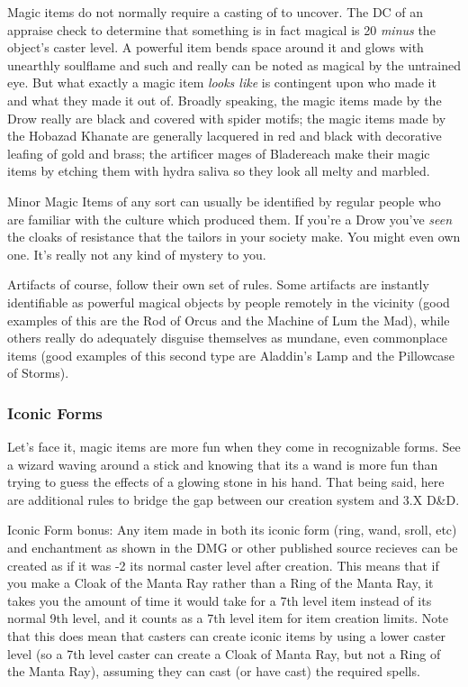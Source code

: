 Magic items do not normally require a casting of  to uncover. The DC of an appraise check to determine that something is in fact magical is 20 \textit{minus} the object's caster level. A powerful item bends space around it and glows with unearthly soulflame and such and really can be noted as magical by the untrained eye. But what exactly a magic item \textit{looks like} is contingent upon who made it and what they made it out of. Broadly speaking, the magic items made by the Drow really are black and covered with spider motifs; the magic items made by the Hobazad Khanate are generally lacquered in red and black with decorative leafing of gold and brass; the artificer mages of Bladereach make their magic items by etching them with hydra saliva so they look all melty and marbled.

Minor Magic Items of any sort can usually be identified by regular people who are familiar with the culture which produced them. If you're a Drow you've \textit{seen} the cloaks of resistance that the tailors in your society make. You might even own one. It's really not any kind of mystery to you.

Artifacts of course, follow their own set of rules. Some artifacts are instantly identifiable as powerful magical objects by people remotely in the vicinity (good examples of this are the Rod of Orcus and the Machine of Lum the Mad), while others really do adequately disguise themselves as mundane, even commonplace items (good examples of this second type are Aladdin's Lamp and the Pillowcase of Storms).

\subsubsection{Iconic Forms}

Let's face it, magic items are more fun when they come in recognizable forms. See a wizard waving around a stick and knowing that its a wand is more fun than trying to guess the effects of a glowing stone in his hand. That being said, here are additional rules to bridge the gap between our creation system and 3.X D\&D.

Iconic Form bonus: Any item made in both its iconic form (ring, wand, sroll, etc) and enchantment as shown in the DMG or other published source recieves can be created as if it was -2 its normal caster level after creation. This means that if you make a Cloak of the Manta Ray rather than a Ring of the Manta Ray, it takes you the amount of time it would take for a 7th level item instead of its normal 9th level, and it counts as a 7th level item for item creation limits. Note that this does mean that casters can create iconic items by using a lower caster level (so a 7th level caster can create a Cloak of Manta Ray, but not a Ring of the Manta Ray), assuming they can cast (or have cast) the required spells.


